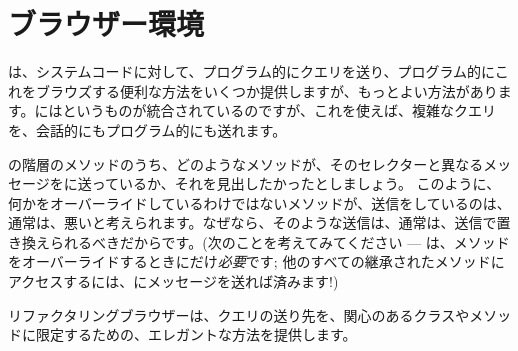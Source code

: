 \documentclass[a4paper,10pt,twoside]{book}
\begin{document}
\section{ブラウザー環境}

は、システムコードに対して、プログラム的にクエリを送り、プログラム的にこれをブラウズする便利な方法をいくつか提供しますが、もっとよい方法があります。\pharo{}にはというものが統合されているのですが、これを使えば、複雑なクエリを、会話的にもプログラム的にも送れます。

の階層のメソッドのうち、どのようなメソッドが、そのセレクターと異なるメッセージを\super{}に送っているか、それを見出したかったとしましょう。
このように、何かをオーバーライドしているわけではないメソッドが、\super{}送信をしているのは、通常は、悪いと考えられます。なぜなら、そのような\super{}送信は、通常は、\self{}送信で置き換えられるべきだからです。(次のことを考えてみてください --- \super{}は、メソッドをオーバーライドするときにだけ\emph{必要}です; 他のすべての継承されたメソッドにアクセスするには、\self{}にメッセージを送れば済みます!)

リファクタリングブラウザーは、クエリの送り先を、関心のあるクラスやメソッドに限定するための、エレガントな方法を提供します。
\end{document}
